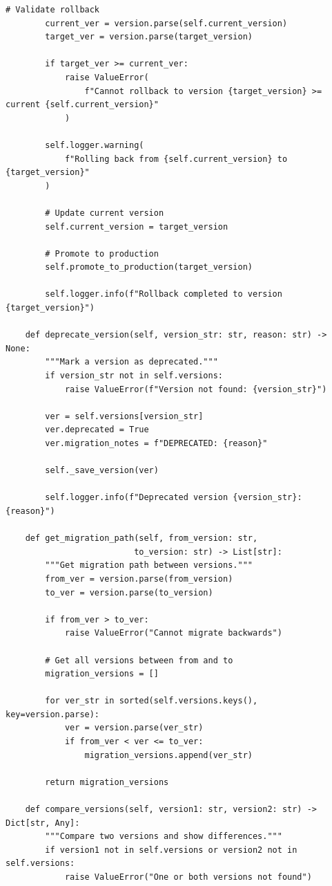\begin{lstlisting}[style=python, caption=DataVersionManager with Semantic Versioning]
        # Validate rollback
        current_ver = version.parse(self.current_version)
        target_ver = version.parse(target_version)

        if target_ver >= current_ver:
            raise ValueError(
                f"Cannot rollback to version {target_version} >= current {self.current_version}"
            )

        self.logger.warning(
            f"Rolling back from {self.current_version} to {target_version}"
        )

        # Update current version
        self.current_version = target_version

        # Promote to production
        self.promote_to_production(target_version)

        self.logger.info(f"Rollback completed to version {target_version}")

    def deprecate_version(self, version_str: str, reason: str) -> None:
        """Mark a version as deprecated."""
        if version_str not in self.versions:
            raise ValueError(f"Version not found: {version_str}")

        ver = self.versions[version_str]
        ver.deprecated = True
        ver.migration_notes = f"DEPRECATED: {reason}"

        self._save_version(ver)

        self.logger.info(f"Deprecated version {version_str}: {reason}")

    def get_migration_path(self, from_version: str,
                          to_version: str) -> List[str]:
        """Get migration path between versions."""
        from_ver = version.parse(from_version)
        to_ver = version.parse(to_version)

        if from_ver > to_ver:
            raise ValueError("Cannot migrate backwards")

        # Get all versions between from and to
        migration_versions = []

        for ver_str in sorted(self.versions.keys(), key=version.parse):
            ver = version.parse(ver_str)
            if from_ver < ver <= to_ver:
                migration_versions.append(ver_str)

        return migration_versions

    def compare_versions(self, version1: str, version2: str) -> Dict[str, Any]:
        """Compare two versions and show differences."""
        if version1 not in self.versions or version2 not in self.versions:
            raise ValueError("One or both versions not found")


\end{lstlisting}
